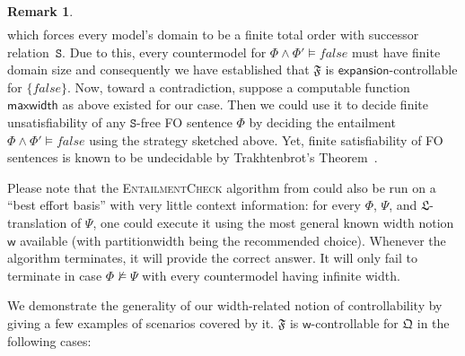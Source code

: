 \documentclass[10pt,a4paper]{amsart}
\theoremstyle{definition}
\newtheorem{rem}[rem]{Remark}
\numberwithin{equation}{section}
\theoremstyle{plain}
\theoremstyle{definition}
\newtheorem{remark}[remark]{Remark}
\theoremstyle{myexample}
\renewenvironment{remark}%
{
	\begin{shaded*}	
		\vspace{-1.5ex}
		\begin{rem}%
		}{
		\end{rem}
		\vspace{-1.5ex}
	\end{shaded*}
}
\theoremstyle{plain}
\theoremstyle{definition}
\newcommand{\fcn}[1]{\mathsf{#1}}
\newcommand{\pred}[1]{\mathtt{#1}}
\begin{document}
\begin{remark}
$$\begin{array}{r}
\end{array}
$$
which forces every model's domain to be a finite total order with successor relation~$\pred{S}$. Due to this, every countermodel for $\Phi \wedge \Phi' \models \mathit{false}$ must have finite domain size and consequently we have established that $\mathfrak{F}$ is $\fcn{expansion}$-controllable for $\{\mathit{false}\}$. Now, toward a contradiction, suppose a computable function $\fcn{maxwidth}$ as above existed for our case. Then we could use it to decide finite unsatisfiability of any $\pred{S}$-free FO sentence $\Phi$ by deciding the entailment $\Phi \wedge \Phi' \models \mathit{false}$ using the strategy sketched above. Yet, finite satisfiability of FO sentences is known to be undecidable by Trakhtenbrot's Theorem~\cite{trakhtenbrot50}.
\end{remark}

Please note that the \textsc{EntailmentCheck} algorithm from  could also be run on a ``best effort basis'' with very little context information: for every $\Phi$, $\Psi$, and $\mathfrak{L}$-translation of $\Psi$, one could execute it using the most general known width notion $\fcn{w}$ available (with partitionwidth being the recommended choice). Whenever the algorithm terminates, it will provide the correct answer. It will only fail to terminate in case $\Phi \not\models \Psi$ with every countermodel having infinite width. 

We demonstrate the generality of our width-related notion of control\-la\-bility by giving a few examples of scenarios covered by it. $\mathfrak{F}$ is $\fcn{w}$-controllable for $\mathfrak{Q}$ in the following cases:
\end{document}
